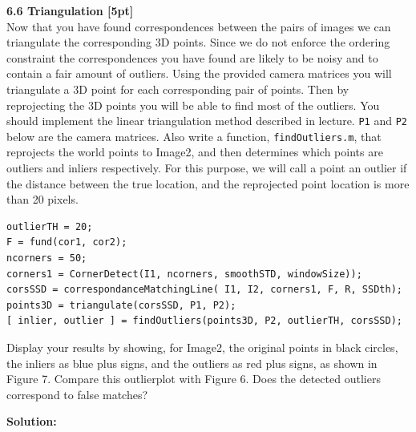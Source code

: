 \documentclass{assignment}
\begin{document}
\begin{problemlist}
\newpage
\textbf{6.6 Triangulation [5pt]}\\
Now that you have found correspondences between the pairs of images we can triangulate the corresponding 3D points. Since we do not enforce the ordering constraint the correspondences you have found are likely to be noisy and to contain a fair amount of outliers. Using the provided camera matrices you will triangulate a 3D point for each corresponding pair of points. Then by reprojecting the 3D points you will be able to find most of the outliers. You should implement the linear triangulation method described in lecture. \texttt{P1} and \texttt{P2} below are the camera matrices. Also write a function, \texttt{findOutliers.m}, that reprojects the world points to Image2, and then determines which points are outliers and inliers respectively. For this purpose, we will call a point an outlier if the distance between the true location, and the reprojected point location is more than 20 pixels.\\
\begin{lstlisting}
outlierTH = 20;
F = fund(cor1, cor2);
ncorners = 50;
corners1 = CornerDetect(I1, ncorners, smoothSTD, windowSize));
corsSSD = correspondanceMatchingLine( I1, I2, corners1, F, R, SSDth);
points3D = triangulate(corsSSD, P1, P2);
[ inlier, outlier ] = findOutliers(points3D, P2, outlierTH, corsSSD);
\end{lstlisting}
Display your results by showing, for Image2, the original points in black circles, the inliers as blue plus signs, and the outliers as red plus signs, as shown in Figure 7. Compare this outlierplot with Figure 6. Does the detected outliers correspond to false matches?

\textbf{Solution:}
        

\newpage

\lstset{
numbers=left
}



\end{problemlist}
\end{document}
